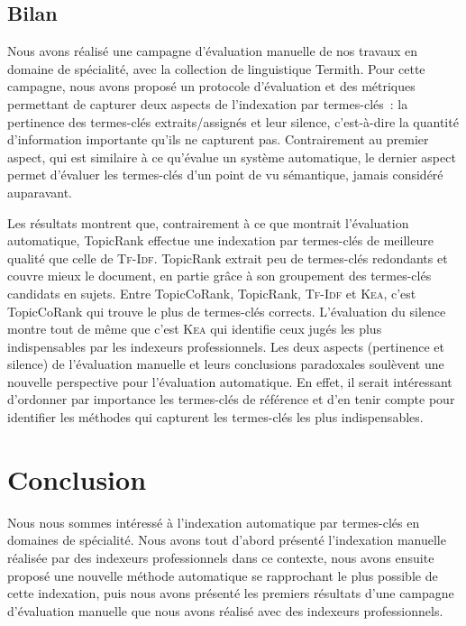     \subsection{Bilan}
    \label{subsec:main-domain_specific_keyphrase_annotation-manual_evaluation-conclusion}
      Nous avons réalisé une campagne d'évaluation manuelle de nos travaux en
      domaine de spécialité, avec la collection de linguistique Termith. Pour
      cette campagne, nous avons proposé un protocole d'évaluation et des
      métriques permettant de capturer deux aspects de l'indexation par
      termes-clés~: la pertinence des termes-clés extraits/assignés et leur
      silence, c'est-à-dire la quantité d'information importante qu'ils ne
      capturent pas. Contrairement au premier aspect, qui est similaire à ce
      qu'évalue un système automatique, le dernier aspect permet d'évaluer les
      termes-clés d'un point de vu sémantique, jamais considéré auparavant.

      Les résultats montrent que, contrairement à ce que montrait l'évaluation
      automatique, TopicRank effectue une indexation par termes-clés de
      meilleure qualité que celle de \textsc{Tf-Idf}. TopicRank extrait peu de
      termes-clés redondants et couvre mieux le document, en partie grâce à son
      groupement des termes-clés candidats en sujets. Entre TopicCoRank,
      TopicRank, \textsc{Tf-Idf} et \textsc{Kea}, c'est TopicCoRank qui trouve
      le plus de termes-clés corrects. L'évaluation du silence montre tout de
      même que c'est \textsc{Kea} qui identifie ceux jugés les plus
      indispensables par les indexeurs professionnels. Les deux aspects
      (pertinence et silence) de l'évaluation manuelle et leurs conclusions
      paradoxales soulèvent une nouvelle perspective pour l'évaluation
      automatique. En effet, il serait intéressant d'ordonner par importance les
      termes-clés de référence et d'en tenir compte pour identifier les méthodes
      qui capturent les termes-clés les plus indispensables.


  \section{Conclusion}
  \label{sec:main-domain_specific_keyphrase_annotation-conclusion}
    Nous nous sommes intéressé à l'indexation automatique par termes-clés en
    domaines de spécialité. Nous avons tout d'abord présenté l'indexation
    manuelle réalisée par des indexeurs professionnels dans ce contexte, nous
    avons ensuite proposé une nouvelle méthode automatique se rapprochant le
    plus possible de cette indexation, puis nous avons présenté les premiers
    résultats d'une campagne d'évaluation manuelle que nous avons réalisé avec
    des indexeurs professionnels.

